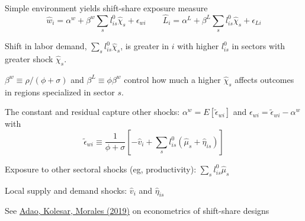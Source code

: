\documentclass[11pt,notes=hide,aspectratio=169]{beamer}
\begin{document}
\begin{frame}{Simple environment yields shift-share exposure measure}
\vspace{-4mm}
\begin{equation*}
    \hat{w}_{i} = \alpha^{w} + \beta^{w} \sum_{s}l_{is}^{0}\hat{\chi}_{s} + \epsilon_{w i}
	\qquad
    \hat{L}_{i} = \alpha^{L} + \beta^{L} \sum_{s}l_{is}^{0}\hat{\chi}_{s} + \epsilon_{L i}
\end{equation*}
\vspace{-4mm}
\begin{itemize}{\small
    \item Shift in labor demand, $\sum_{s}l_{is}^{0}\hat{\chi}_{s}$, is greater in $i$ with higher $l_{is}^{0}$ in sectors with greater shock $\hat{\chi}_{s}$.
    \item $\beta^{w} \equiv \rho/(\phi+\sigma)$ and $\beta^{L} \equiv \phi \beta^{w}$ control how much a higher $\hat{\chi}_{s}$ affects outcomes in regions specialized in sector $s$.
    \item The constant and residual capture other shocks: $\alpha^{w} = E[\tilde{\epsilon}_{w i}]$ and $\epsilon_{w i} = \tilde{\epsilon}_{w i} - \alpha^{w}$ with
    $$ \tilde{\epsilon}_{w i} \equiv \frac{1}{\phi+\sigma}\left[-\hat{v}_{i} + \sum_{s}l_{is}^{0}(\hat{\mu}_{s} + \hat{\eta}_{is})\right] $$
    \item Exposure to other sectoral shocks (eg, productivity): $\sum_{s}l_{is}^{0}\hat{\mu}_{s}$
    \item Local supply and demand shocks: $\hat{v}_{i}$ and $\hat{\eta}_{is}$
    \item See \href{https://academic.oup.com/qje/article-abstract/134/4/1949/5552146}{Adao, Kolesar, Morales (2019)} on econometrics of shift-share designs
}\end{itemize}
\end{frame}
\end{document}

